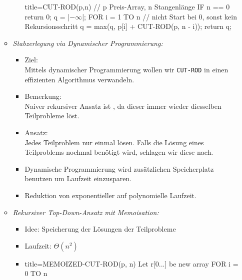 \documentclass[
    12pt,
    a4paper,
    ngerman,
    color=3b,%
    marginpar=false,
    colorback=false,
    leqno,
]{tudaexercise}
\begin{document}
\begin{itemize}
\begin{itemize}
\begin{itemize}
\begin{ccode}[autogobble,escapeinside=||]{title={CUT-ROD(p,n)    // p Preis-Array, n Stangenlänge}}
                            IF n == 0
                                return 0;
                            q = |$-\infty$|;
                            FOR i = 1 TO n  // nicht Start bei 0, sonst kein Rekursionsschritt
                                q = max(q, p[i] + CUT-ROD(p, n - i));
                            return q;
                            \end{ccode}
                    \end{itemize}
                \item \textit{Stabzerlegung via Dynamischer Programmierung:}
                    \begin{itemize}
                        \item Ziel: \\
                                Mittels dynamischer Programmierung wollen wir \texttt{CUT-ROD} in einen effizienten
                                Algorithmus verwandeln.
                        \item Bemerkung: \\
                                Naiver rekursiver Ansatz ist , da dieser immer wieder diesselben 
                                Teilprobleme löst.
                        \item Ansatz: \\
                                Jedes Teilproblem nur einmal lösen. Falls die Lösung eines Teilproblems nochmal benötigt
                                wird, schlagen wir diese nach.
                        \item Dynamische Programmierung wird zusätzlichen Speicherplatz benutzen um Laufzeit einzusparen.
                        \item Reduktion von exponentieller auf polynomielle Laufzeit.
                    \end{itemize}
                \item \textit{Rekursiver Top-Down-Ansatz mit Memoisation:}
                    \begin{itemize}
                        \item Idee: Speicherung der Lösungen der Teilprobleme
                        \item Laufzeit: $\Theta(n^2)$
                        \item[]
                            \begin{ccode}[autogobble,escapeinside=||]{title={MEMOIZED-CUT-ROD(p, n)}}
                            Let r[0...] be new array
                            FOR i = 0 TO n

\end{ccode}
\end{itemize}
\end{itemize}
\end{itemize}
\end{document}
